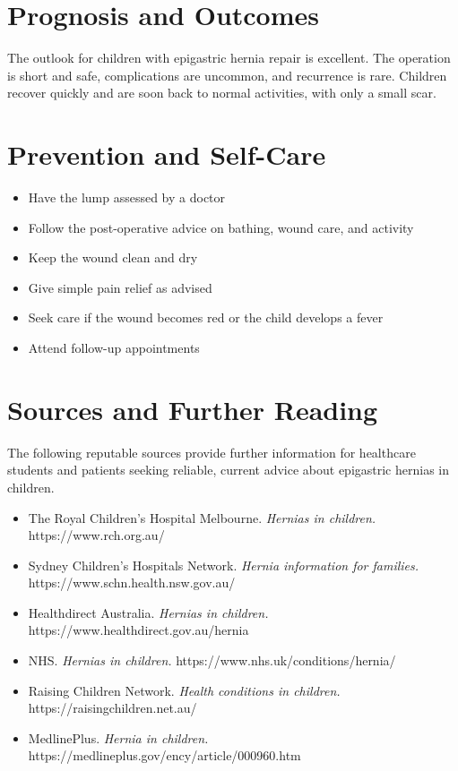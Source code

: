 \section*{Prognosis and Outcomes}
The outlook for children with epigastric hernia repair is excellent. The operation is short and safe, complications are uncommon, and recurrence is rare. Children recover quickly and are soon back to normal activities, with only a small scar.

\section*{Prevention and Self-Care}
\begin{itemize}
    \item Have the lump assessed by a doctor
    \item Follow the post-operative advice on bathing, wound care, and activity
    \item Keep the wound clean and dry
    \item Give simple pain relief as advised
    \item Seek care if the wound becomes red or the child develops a fever
    \item Attend follow-up appointments
\end{itemize}

\section*{Sources and Further Reading}
The following reputable sources provide further information for healthcare students and patients seeking reliable, current advice about epigastric hernias in children.
\begin{itemize}
    \item The Royal Children's Hospital Melbourne. \textit{Hernias in children.} https://www.rch.org.au/
    \item Sydney Children's Hospitals Network. \textit{Hernia information for families.} https://www.schn.health.nsw.gov.au/
    \item Healthdirect Australia. \textit{Hernias in children.} https://www.healthdirect.gov.au/hernia
    \item NHS. \textit{Hernias in children.} https://www.nhs.uk/conditions/hernia/
    \item Raising Children Network. \textit{Health conditions in children.} https://raisingchildren.net.au/
    \item MedlinePlus. \textit{Hernia in children.} https://medlineplus.gov/ency/article/000960.htm
\end{itemize}
